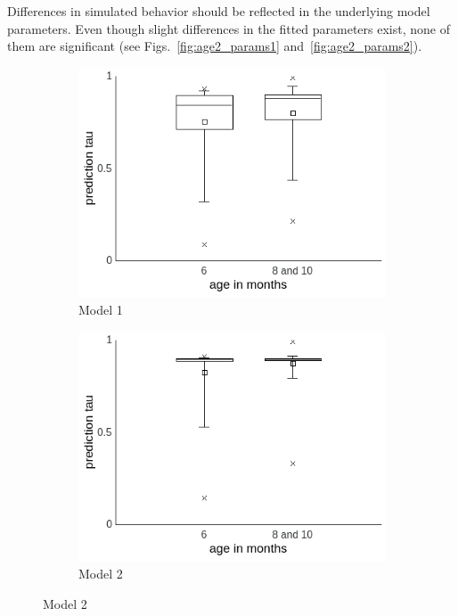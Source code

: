 \documentclass[a4paper]{scrreprt}
\begin{document}
Differences in simulated behavior should be reflected in the underlying model parameters. Even though slight differences in the fitted parameters exist, none of them are significant (see Figs.~\ref{fig:age2_params1} and~\ref{fig:age2_params2}).

\begin{figure}
\centering
    \begin{subfigure}[b]{0.49\textwidth}
        \includegraphics[width=\textwidth]{figs/sec3/age/age2_pred_mod1.jpeg}
        \caption{Model 1}
    \end{subfigure}
\begin{subfigure}[b]{0.49\textwidth}
        \includegraphics[width=\textwidth]{figs/sec3/age/age2_pred_mod2.jpeg}
        \caption{Model 2}
    \end{subfigure}
    

\end{figure}
\end{document}
